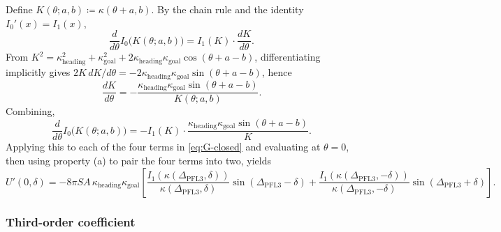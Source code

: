 \documentclass[11pt, a4paper]{article}
\newcommand{\kh}{\kappa_{\mathrm{heading}}}
\newcommand{\kg}{\kappa_{\mathrm{goal}}}
\newcommand{\Dp}{\Delta_{\mathrm{PFL3}}}
\begin{document}
Define $K(\theta; a, b) \coloneqq \kappa(\theta + a, b)$.  By the chain rule
and the identity $I_0'(x) = I_1(x)$,
%
\begin{equation}
\label{eq:dI0-chain}
\frac{d}{d\theta} I_0\bigl(K(\theta; a,b)\bigr)
  = I_1(K) \cdot \frac{dK}{d\theta}.
\tag{13a}
\end{equation}
%
From $K^2 = \kh^2 + \kg^2 + 2\kh\kg\cos(\theta + a - b)$, differentiating
implicitly gives $2K\,dK/d\theta = -2\kh\kg\sin(\theta + a - b)$, hence
%
\begin{equation}
\frac{dK}{d\theta}
  = -\frac{\kh\kg\sin(\theta + a - b)}{K(\theta; a, b)}.
\tag{13b}
\end{equation}
%
Combining,
%
\begin{equation}
\frac{d}{d\theta} I_0\bigl(K(\theta; a,b)\bigr)
  = -I_1(K)\cdot\frac{\kh\kg\sin(\theta + a - b)}{K}.
\tag{13c}
\end{equation}
%
Applying this to each of the four terms in \cref{eq:G-closed} and evaluating at
$\theta = 0$, then using property (a) to pair the four terms into two, yields
%
\begin{equation}
\label{eq:Uprime}
\boxed{
U'(0, \delta)
  = -8\pi SA\,\kh\kg
    \left[
      \frac{I_1(\kappa(\Dp, \delta))}{\kappa(\Dp, \delta)}
      \sin(\Dp - \delta)
    + \frac{I_1(\kappa(\Dp, -\delta))}{\kappa(\Dp, -\delta)}
      \sin(\Dp + \delta)
    \right].
}
\tag{14}
\end{equation}

\subsubsection{Third-order coefficient}
\label{sec:B-coeff}
\end{document}
